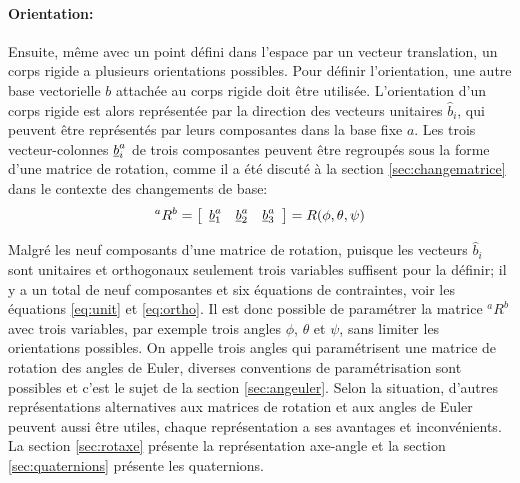 \paragraph{Orientation:}
%
Ensuite, même avec un point défini dans l'espace par un vecteur translation, un corps rigide a plusieurs orientations possibles. Pour définir l'orientation, une autre base vectorielle $b$ attachée au corps rigide doit être utilisée. L'orientation d'un corps rigide est alors représentée par la direction des vecteurs unitaires $\hat{b}_i$, qui peuvent être représentés par leurs composantes dans la base fixe $a$. Les trois vecteur-colonnes $\underline{b}_i^a$ de trois composantes peuvent être regroupés sous la forme d'une matrice de rotation, comme il a été discuté à la section \ref{sec:changematrice} dans le contexte des changements de base:
\begin{equation}
^aR^b = \left[ \begin{array}{ c c c } \underline{b}_1^a &  \underline{b}_2^a & \underline{b}_3^a  \end{array} \right] = R(\phi,\theta,\psi)
\end{equation} 

Malgré les neuf composants d'une matrice de rotation, puisque les vecteurs $\hat{b}_i$ sont unitaires et orthogonaux seulement trois variables suffisent pour la définir; il y a un total de neuf composantes et six équations de contraintes, voir les équations \eqref{eq:unit} et \eqref{eq:ortho}. Il est donc possible de paramétrer la matrice $^aR^b$ avec trois variables, par exemple trois angles $\phi$, $\theta$ et $\psi$, sans limiter les orientations possibles. On appelle trois angles qui paramétrisent une matrice de rotation des angles de Euler, diverses conventions de paramétrisation sont possibles et c'est le sujet de la section \ref{sec:angeuler}. Selon la situation, d'autres représentations alternatives aux matrices de rotation et aux angles de Euler peuvent aussi être utiles, chaque représentation a ses avantages et inconvénients. La section \ref{sec:rotaxe} présente la représentation axe-angle et la section \ref{sec:quaternions} présente les quaternions. 


